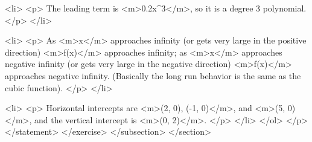                         <li>
                            <p>
                                The leading term is <m>0.2x^{3}</m>, so it is a degree 3 polynomial.
                            </p>
                        </li>

                        <li>
                            <p>
                                As <m>x</m> approaches infinity (or gets very large in the positive direction) <m>f(x)</m> approaches infinity; as <m>x</m> approaches negative infinity (or gets very large in the negative direction) <m>f(x)</m> approaches negative infinity.
                                (Basically the long run behavior is the same as the cubic function).
                            </p>
                        </li>

                        <li>
                            <p>
                                Horizontal intercepts are <m>(2, 0), (-1, 0)</m>, and <m>(5, 0)</m>, and the vertical intercept is <m>(0, 2)</m>.
                            </p>
                        </li>
                    </ol>
                </p>
            </statement>
        </exercise>
    </subsection>
</section>